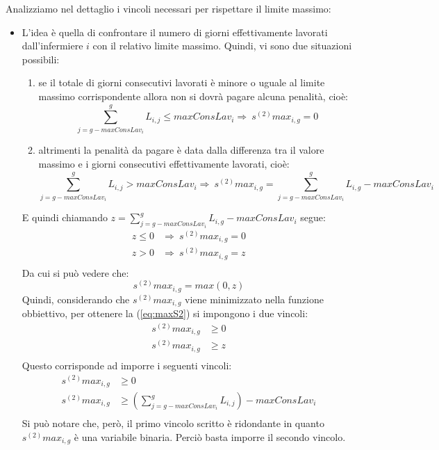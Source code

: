 Analizziamo nel dettaglio i vincoli necessari per rispettare il limite massimo:
\begin{itemize}

\item L'idea è quella di confrontare il numero di giorni effettivamente lavorati dall'infermiere $i$ con il relativo limite massimo. Quindi, vi sono due situazioni possibili:
\begin{enumerate}
\item  se il totale di giorni consecutivi lavorati è minore o uguale al limite massimo corrispondente allora non si dovrà pagare alcuna penalità, cioè:
\begin{equation}
\sum_{j=g-maxConsLav_i}^g L_{i, j} \leq maxConsLav_i \Longrightarrow\ s^{(2)}max_{i, g} = 0
\end{equation}
\item altrimenti la penalità da pagare è data dalla differenza tra il valore massimo e i giorni consecutivi effettivamente lavorati, cioè:
\begin{equation}
\sum_{j=g-maxConsLav_i}^g L_{i, j} > maxConsLav_i \Longrightarrow\ s^{(2)}max_{i, g} = \sum_{j=g-maxConsLav_i}^g L_{i, g} - maxConsLav_i
\end{equation}
\end{enumerate}
E quindi chiamando $ z = \sum_{j=g-maxConsLav_i}^g L_{i, g} - maxConsLav_i$ segue:
\begin{equation}
\begin{split}
z \leq 0 &\Longrightarrow\ s^{(2)}max_{i, g} = 0 \\
z > 0 &\Longrightarrow\ s^{(2)}max_{i, g} = z \\
\end{split}
\end{equation}
Da cui si può vedere che:
\begin{equation}
\label{eq:maxS2}
s^{(2)}max_{i, g} = max(0, z)
\end{equation}
Quindi, considerando che $s^{(2)}max_{i, g}$ viene minimizzato nella funzione obbiettivo, per ottenere la (\ref{eq:maxS2}) si impongono i due vincoli:
\begin{equation}
\begin{split}
s^{(2)}max_{i, g} &\geq 0 \\
s^{(2)}max_{i, g} &\geq z \\
\end{split}
\end{equation}
Questo corrisponde ad imporre i seguenti vincoli:
\begin{equation}
\begin{split}
s^{(2)}max_{i, g} &\geq 0\\
s^{(2)}max_{i, g} &\geq (\sum_{j=g-maxConsLav_i}^g L_{i, j}) - maxConsLav_i\\
\end{split}
\end{equation}
Si può notare che, però, il primo vincolo scritto è ridondante in quanto $s^{(2)}max_{i, g}$ è una variabile binaria. Perciò basta imporre il secondo vincolo.


\end{itemize}
